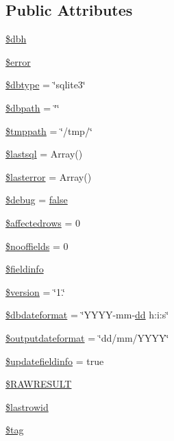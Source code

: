 \subsection*{Public Attributes}
\begin{DoxyCompactItemize}
\item 
\hyperlink{classDebby_aa4930493a32523bb82bf4491e6e48f01}{\$dbh}
\item 
\hyperlink{classDebby_a0ac5d819d971fa898a2e88dc5991b008}{\$error}
\item 
\hyperlink{classDebby_a4697ceb97e707ab80ae2a215f932b58d}{\$dbtype} = \char`\"{}sqlite3\char`\"{}
\item 
\hyperlink{classDebby_a95c130458f29f6c7c240cdc93a071085}{\$dbpath} = \char`\"{}\char`\"{}
\item 
\hyperlink{classDebby_afffc183cbae8307150a838bf3a053ca8}{\$tmppath} = \char`\"{}/tmp/\char`\"{}
\item 
\hyperlink{classDebby_ae609a3e9058918214dbac27c36381323}{\$lastsql} = Array()
\item 
\hyperlink{classDebby_ab74aec371d05b763d7c8123b80621c3d}{\$lasterror} = Array()
\item 
\hyperlink{classDebby_a7ff78fa74f4b5822202b30a254600012}{\$debug} = \hyperlink{tina4_8php_aec2deb5590a84bee262c3bea206ae88f}{false}
\item 
\hyperlink{classDebby_ab409e48612acfcba8cf89743b45b4457}{\$affectedrows} = 0
\item 
\hyperlink{classDebby_a72634c1e21e0f68c5a69e6a1db478ff5}{\$nooffields} = 0
\item 
\hyperlink{classDebby_a7d54dc610647753b09fd501ee0b65f54}{\$fieldinfo}
\item 
\hyperlink{classDebby_a378b706b515617c9019b313136e4678c}{\$version} = \char`\"{}1.\char`\"{}
\item 
\hyperlink{classDebby_a2f7e21b7f33e7ad7ea66a5f55ad7876a}{\$dbdateformat} = \char`\"{}Y\+Y\+Y\+Y-\/mm-\/\hyperlink{Shape_8php_ab8bded9253c481cadc72d4df086e52b7}{dd} h\+:i\+:s\char`\"{}
\item 
\hyperlink{classDebby_a708fea658eab39aad196703f8b8aaa18}{\$outputdateformat} = \char`\"{}dd/mm/Y\+Y\+Y\+Y\char`\"{}
\item 
\hyperlink{classDebby_a3e7f1fb2178543ff80e0ce7e7b85e528}{\$updatefieldinfo} = true
\item 
\hyperlink{classDebby_a462ad03fefee05b5f763469f8bb5abfc}{\$\+R\+A\+W\+R\+E\+S\+U\+L\+T}
\item 
\hyperlink{classDebby_af86fbd6343eccc180f84e816627a5a91}{\$lastrowid}
\item 
\hyperlink{classDebby_aaa503bfd657eddafff230f0d49da7cb1}{\$tag}
\end{DoxyCompactItemize}


